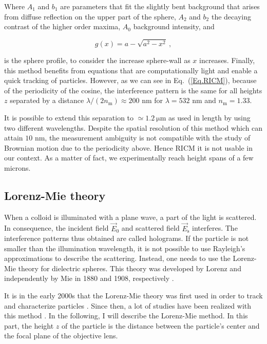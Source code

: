 Where $A_1$ and $b_1$ are parameters \cite{raedler_measurement_1992} that fit the slightly bent background that arises from diffuse reflection on the upper part of the sphere, $A_2$ and $b_2$ the decaying contrast of the higher order maxima, $A_0$ background intensity, and

\begin{equation}
	g(x) = a - \sqrt{a^2 - x^2} ~,
\end{equation}

is the sphere profile, to consider  the increase sphere-wall as $x$ increases.
Finally, this method benefits from equations that are computationally light and enable a quick tracking of particles. However, as we can see in Eq.~(\ref{Eq.RICM}), because of the periodicity of the cosine, the interference pattern is the same for all heights $z$ separated by a distance $\lambda / (2n_\mathrm{m}) \approx 200 $ nm for $\lambda = 532$ nm and $n_{\mathrm{m}} = 1.33$. 

It is possible to extend this separation to $\simeq 1.2 ~ \mathrm{\mu m}$ as used in \cite{davies_elastohydrodynamic_2018} length by using two different wavelengths. Despite the spatial resolution of this method which can attain $10$ nm, the measurement ambiguity is not compatible with the study of Brownian motion due to the periodicity above. Hence \gls{RICM} it is not usable in our context. As a matter of fact, we experimentally reach height spans of a few microns. 




\subsection{Lorenz-Mie theory}
\label{chap:LM_fit}

When a colloid is illuminated with a plane wave, a part of the light is scattered. In consequence, the incident field $\vec{E}_0$ and scattered field $\vec{E}_\mathrm{s}$ interferes. The interference patterns thus obtained are called holograms. If the particle is not smaller than the illumination wavelength, it is not possible to use Rayleigh's approximations \cite{strutt_lviii_1871} to describe the scattering. Instead, one needs to use the Lorenz-Mie theory for dielectric spheres. This theory was developed by Lorenz and independently by Mie in 1880 and 1908, respectively \cite{lorenz_lysbevaegelsen_1890, mie_beitrage_1908}. 

It is in the early 2000s that the Lorenz-Mie theory was first used in order to track and characterize particles \cite{ovryn_imaging_2000, lee_characterizing_2007}. Since then, a lot of studies have been realized with this method \cite{katz_applications_2010}. In the following, I will describe the Lorenz-Mie method. In this part, the height $z$ of the particle is the distance between the particle's center and the focal plane of the objective lens.

